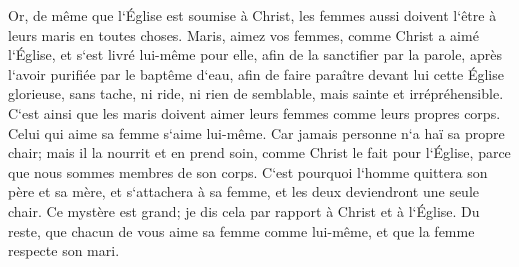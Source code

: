 \verse Or, de même que l`Église est soumise à Christ, les femmes aussi doivent l`être à leurs maris en toutes choses. 
\verse Maris, aimez vos femmes, comme Christ a aimé l`Église, et s`est livré lui-même pour elle, 
\verse afin de la sanctifier par la parole, après l`avoir purifiée par le baptême d`eau, 
\verse afin de faire paraître devant lui cette Église glorieuse, sans tache, ni ride, ni rien de semblable, mais sainte et irrépréhensible. 
\verse C`est ainsi que les maris doivent aimer leurs femmes comme leurs propres corps. Celui qui aime sa femme s`aime lui-même. 
\verse Car jamais personne n`a haï sa propre chair; mais il la nourrit et en prend soin, comme Christ le fait pour l`Église, 
\verse parce que nous sommes membres de son corps. 
\verse C`est pourquoi l`homme quittera son père et sa mère, et s`attachera à sa femme, et les deux deviendront une seule chair. 
\verse Ce mystère est grand; je dis cela par rapport à Christ et à l`Église. 
\verse Du reste, que chacun de vous aime sa femme comme lui-même, et que la femme respecte son mari. 

